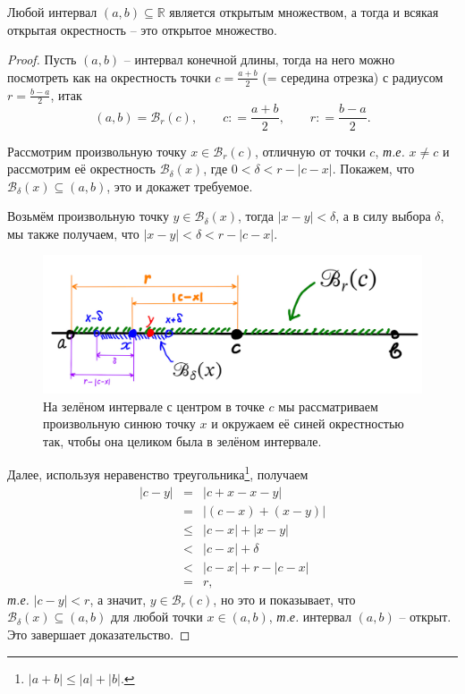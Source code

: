 \begin{lemma}\label{interval_is_open}
Любой интервал $(a,b) \subseteq \mathbb{R}$ является открытым множеством, а тогда и всякая открытая окрестность -- это открытое множество.
\end{lemma}
\begin{proof} 
Пусть $(a,b)$ -- интервал конечной длины, тогда на него можно посмотреть как на окрестность точки $c = \frac{a+b}{2}$ (= середина отрезка) с радиусом $r = \frac{b-a}{2}$, итак
\[
 (a,b) = \mathscr{B}_r(c), \qquad c : = \frac{a+b}{2}, \qquad r: = \frac{b-a}{2}.
\]

Рассмотрим произвольную точку $x \in \mathscr{B}_r(c)$, отличную от точки $c$, \textit{т.е.} $x \ne c$ и рассмотрим её окрестность $\mathscr{B}_\delta(x)$, где $0 < \delta < r-|c-x|$. Покажем, что $\mathscr{B}_\delta(x) \subseteq (a,b)$, это и докажет требуемое.

Возьмём произвольную точку $y\in \mathscr{B}_\delta(x)$, тогда $|x-y|<\delta$, а в силу выбора $\delta$, мы также получаем, что $|x-y| < \delta < r-|c-x|.$

\begin{figure}[h!]
    \centering
    \includegraphics[scale=0.5]{images/open_is_open.jpg}
    \caption{На зелёном интервале с центром в точке $c$ мы рассматриваем произвольную синюю точку $x$ и окружаем её синей окрестностью так, чтобы она целиком была в зелёном интервале.}
    \label{fig:enter-label}
\end{figure}

Далее, используя неравенство треугольника\footnote{$|a+b|\le |a| + |b|.$}, получаем
\begin{eqnarray*}
    |c-y| &=& |c+x-x-y| \\
    &=& |(c-x) + (x-y)| \\
    &\le& |c-x| + |x-y| \\
    &<& |c-x| + \delta \\
    &<& |c-x| + r- |c-x| \\
    &=& r,
\end{eqnarray*}
\textit{т.е.} $|c-y| < r$, а значит, $y \in \mathscr{B}_r(c)$, но это и показывает, что $\mathscr{B}_\delta(x) \subseteq (a,b)$ для любой точки $x \in (a,b)$, \textit{т.е.} интервал $(a,b)$ -- открыт. Это завершает доказательство.
\end{proof}

